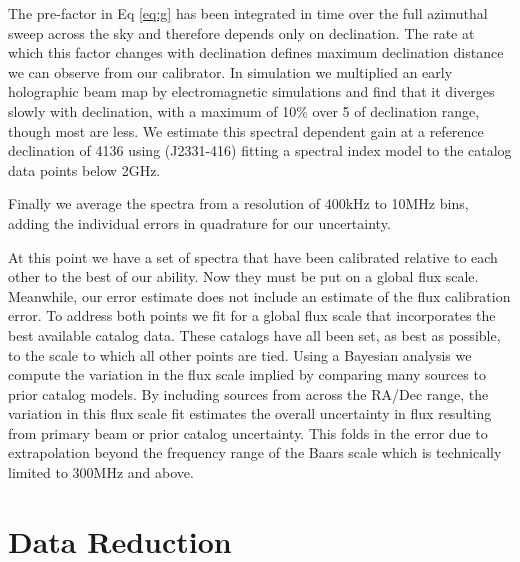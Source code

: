 \documentclass[preprint]{aastex}
\begin{document}
The pre-factor in Eq \ref{eq:g} has been integrated in time over the full azimuthal sweep across the sky and therefore depends only on declination. The rate at which this factor
changes with declination defines maximum declination distance we can observe from our calibrator. 
In simulation we multiplied an early holographic beam map \cite{Pober:2012p8800}
by electromagnetic simulations and find that it 
diverges slowly with declination, with a maximum of 10\% over 5\arcdeg{} of declination range, though most are less. 
We estimate this spectral dependent gain at a reference declination of 41\arcdeg{}36\arcmin{}   using (J2331-416) fitting a spectral index model to the
 catalog data points below 2GHz. 
 
 Finally we average the spectra from a resolution of 400kHz to 10MHz bins, adding the individual errors in quadrature
 for our uncertainty.

At this point we have a set of spectra that have been calibrated relative to each other to the best of our ability. Now 
they must be put on a global flux scale. Meanwhile, our error estimate does not include an estimate of the 
flux calibration error.  To address both points we fit for a global flux scale that incorporates the best available
catalog data. These catalogs
have all been set, as best as possible, to the \citet{Baars:1977p9678} scale to which all other points are tied. Using a Bayesian analysis we compute the 
variation in the flux scale implied by comparing many sources to prior catalog models. By including sources from across
the RA/Dec range, the variation in this flux scale fit estimates the overall uncertainty in flux resulting from primary beam 
or prior catalog uncertainty.  This folds in the error due to extrapolation beyond the frequency range of the Baars scale which is
technically limited to 300MHz and above.

 
 \section{Data Reduction}
 \label{sec:Observations}
\end{document}
